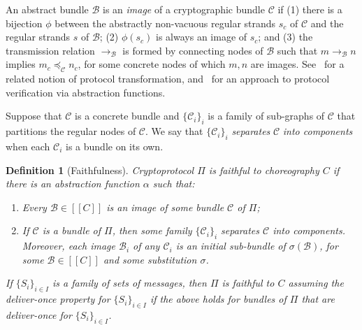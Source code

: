\documentclass[copyright]{eptcs}
\newcommand{\bnd}{\mathcal{B}}
\newcommand{\bndC}{\mathcal{C}}
\newcommand{\sembrack}[1]{[\![#1]\!]}
\newtheorem{definition}{Definition}
\begin{document}
An abstract bundle $\bnd$ is an \emph{image} of a cryptographic bundle
$\bndC$ if (1) there is a bijection $\phi$ between the abstractly
non-vacuous regular strands $s_c$ of $\bndC$ and the regular strands
$s$ of $\bnd$; (2) $\phi(s_c)$ is always an image of $s_c$; and (3)
the transmission relation $\rightarrow_{\bnd}$ is formed by connecting
nodes of $\bnd$ such that $m\rightarrow_{\bnd}n$ implies
$m_c\preceq_{\bndC}n_c$, for some concrete nodes of which $m,n$ are
images.  See~\cite{Guttman09a} for a related notion of protocol
transformation, and~\cite{MaffeiEtAl07} for an approach to protocol
verification via abstraction functions.

Suppose that $\bndC$ is a concrete bundle and $\{\bndC_i\}_i$ is a
family of sub-graphs of $\bndC$ that partitions the regular nodes of
$\bndC$.  We say that $\{\bndC_i\}_i$ \emph{separates} $\bndC$
\emph{into components} when each $\bndC_i$ is a bundle on its own.

\begin{definition}[Faithfulness] \label{def:faithful}
Cryptoprotocol $\Pi$ is \emph{faithful to} choreography $C$ if there
is an abstraction function $\alpha$ such that:
\begin{enumerate}
  \item Every $\bnd\in\sembrack{C}$ is an image of some bundle $\bndC$
  of $\Pi$;\label{clause:fth:upward:cover}
  \item If $\bndC$ is a bundle of $\Pi$, then some family
  $\{\bndC_i\}_i$ separates $\bndC$ into components.  Moreover, each
  image $\bnd_i$ of any $\bndC_i$ is an initial sub-bundle of
  $\sigma(\bnd)$, for some $\bnd\in\sembrack{C}$ and some substitution
  $\sigma$.\label{clause:fth:downward:separate}
\end{enumerate}
If $\{S_i\}_{i\in I}$ is a family of sets of messages, then $\Pi$ is
\emph{faithful to} $C$ \emph{assuming the deliver-once property for}
$\{S_i\}_{i\in I}$ if the above holds for bundles of $\Pi$ that are
deliver-once for $\{S_i\}_{i\in I}$.
\end{definition}

\smallskip
\end{document}
